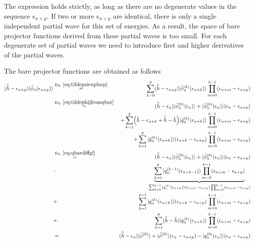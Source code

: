 \documentclass[11pt,a4paper]{report}
\begin{document}
The expression  holds strictly, as long as there
are no degenerate values in the sequence $\epsilon_{n+p}$. If two or
more $\epsilon_{n+p}$ are identical, there is only a single
independent partial wave for this set of energies. As a result, the
space of bare projector functions derived from these partial waves is
too small. For each degenerate set of partial waves we need to
introduce first and higher derivatives of the partial waves.

The bare projector functions are obtained as follows
\begin{eqnarray}
(\hat{\tilde{h}}-\epsilon_{n+p})
|\tilde{\phi}_n(\epsilon_{n+p})\rangle
&\eqrel{eq:tildepsienplusp}{=}&
\sum_{k=0}^{p}
(\hat{\tilde{h}}-\epsilon_{n+p})
|\tilde{\phi}_n^{(k)}(\epsilon_{n+k})\rangle
\prod_{m=0}^{k-1}(\epsilon_{n+m}-\epsilon_{n+p})
\nonumber\\
&\eqrel{eq:tildephijfromqbar}{=}&
(\hat{\tilde{h}}-\epsilon_{n})|\tilde{\phi}_n^{(0)}(\epsilon_{n})\rangle
+|\tilde{\phi}^{(0)}_n(\epsilon_{n})\rangle(\epsilon_n-\epsilon_{n+p})
\nonumber\\
&&+
\sum_{k=1}^{p}
\Bigl(\hat{h}-\epsilon_{n+k}+\hat{\tilde{h}}-\hat{h}\Bigr)
|\bar{q}_n^{(k)}(\epsilon_{n+k})\rangle
\prod_{m=0}^{k-1}(\epsilon_{n+m}-\epsilon_{n+p})
\nonumber\\
&&+
\sum_{k=1}^{p}
|\bar{q}_n^{(k)}(\epsilon_{n+k})\rangle(\epsilon_{n+k}-\epsilon_{n+p})
\prod_{m=0}^{k-1}(\epsilon_{n+m}-\epsilon_{n+p})
\nonumber\\
&\eqrel{eq:qbardiffgl}{=}&
(\hat{\tilde{h}}-\epsilon_{n})|\tilde{\phi}_n^{(0)}(\epsilon_{n})\rangle
+|\tilde{\phi}^{(0)}_n(\epsilon_{n})\rangle(\epsilon_n-\epsilon_{n+p})
\nonumber\\
&-&
\underbrace{\sum_{k=1}^{p}
|q_n^{(k-1)}(\epsilon_{n+k-1})\rangle
\prod_{m=0}^{k-1}(\epsilon_{n+m}-\epsilon_{n+p})}
_{
\sum_{k=0}^{p-1}
|q_n^{(k)}(\epsilon_{n+k})\rangle(\epsilon_{n+k}-\epsilon_{n+p})
\prod_{m=0}^{k-1}(\epsilon_{n+m}-\epsilon_{n+p})
}
\nonumber\\
&+&\sum_{k=1}^{p-1}
|q_n^{(k)}(\epsilon_{n+k})\rangle(\epsilon_{n+k}-\epsilon_{n+p})
\prod_{m=0}^{k-1}(\epsilon_{n+m}-\epsilon_{n+p})
\nonumber\\
&+&\sum_{k=1}^{p}
(\hat{\tilde{h}}-\hat{h})
|q_n^{(k)}(\epsilon_{n+k})\rangle
\prod_{m=0}^{k-1}(\epsilon_{n+m}-\epsilon_{n+p})
\nonumber\\
&=&
(\hat{\tilde{h}}-\epsilon_{n})|\tilde{\phi}^{(0)}\rangle
+|\tilde{\phi}^{(0)}\rangle(\epsilon_n-\epsilon_{n+p})
-|q_n^{(0)}(\epsilon_{n})\rangle(\epsilon_{n}-\epsilon_{n+p})

\end{eqnarray}
\end{document}
